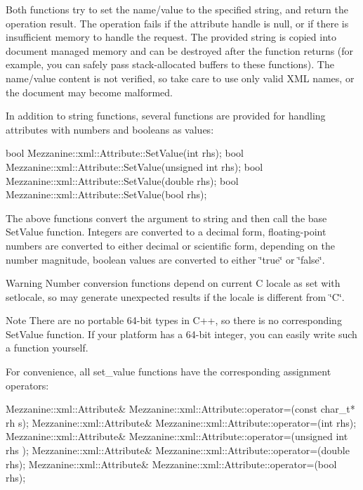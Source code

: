  Both functions try to set the name/value to the specified string, and return the operation result. The operation fails if the attribute handle is null, or if there is insufficient memory to handle the request. The provided string is copied into document managed memory and can be destroyed after the function returns (for example, you can safely pass stack-\/allocated buffers to these functions). The name/value content is not verified, so take care to use only valid XML names, or the document may become malformed. \par
 \par
 In addition to string functions, several functions are provided for handling attributes with numbers and booleans as values: 
\begin{DoxyCode}
 bool Mezzanine::xml::Attribute::SetValue(int rhs);
 bool Mezzanine::xml::Attribute::SetValue(unsigned int rhs);
 bool Mezzanine::xml::Attribute::SetValue(double rhs);
 bool Mezzanine::xml::Attribute::SetValue(bool rhs);
\end{DoxyCode}
 The above functions convert the argument to string and then call the base SetValue function. Integers are converted to a decimal form, floating-\/point numbers are converted to either decimal or scientific form, depending on the number magnitude, boolean values are converted to either \char`\"{}true\char`\"{} or \char`\"{}false\char`\"{}. \begin{DoxyWarning}{Warning}
Number conversion functions depend on current C locale as set with setlocale, so may generate unexpected results if the locale is different from \char`\"{}C\char`\"{}.
\end{DoxyWarning}
\begin{DoxyNote}{Note}
There are no portable 64-\/bit types in C++, so there is no corresponding SetValue function. If your platform has a 64-\/bit integer, you can easily write such a function yourself.
\end{DoxyNote}
For convenience, all set\_\-value functions have the corresponding assignment operators: 
\begin{DoxyCode}
 Mezzanine::xml::Attribute& Mezzanine::xml::Attribute::operator=(const char_t* rh
      s);
 Mezzanine::xml::Attribute& Mezzanine::xml::Attribute::operator=(int rhs);
 Mezzanine::xml::Attribute& Mezzanine::xml::Attribute::operator=(unsigned int rhs
      );
 Mezzanine::xml::Attribute& Mezzanine::xml::Attribute::operator=(double rhs);
 Mezzanine::xml::Attribute& Mezzanine::xml::Attribute::operator=(bool rhs);
\end{DoxyCode}
